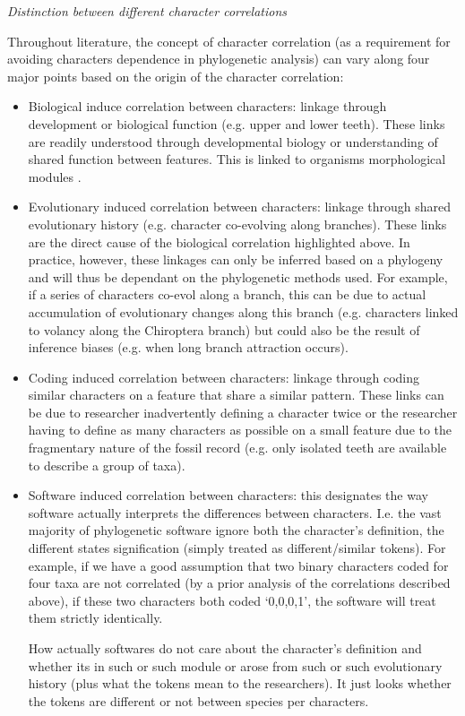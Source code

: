 \documentclass[12pt,letterpaper]{article}
\renewcommand{\subsection}[1]{%
\bigskip
\begin{center}
\begin{large}
\normalfont\itshape #1
\end{large}
\end{center}}
\begin{document}
\subsection{Distinction between different character correlations}

Throughout literature, the concept of character correlation (as a requirement for avoiding characters dependence in phylogenetic analysis) can vary along four major points based on the origin of the character correlation:
\begin{itemize}
    \item Biological induce correlation between characters: linkage through development or biological function (e.g. upper and lower teeth).
    These links are readily understood through developmental biology or understanding of shared function between features.
    This is linked to organisms morphological modules \citep[\textit{sensu}][]{goswami2006morphological}.

    \item Evolutionary induced correlation between characters: linkage through shared evolutionary history (e.g. character co-evolving along branches).
    These links are the direct cause of the biological correlation highlighted above.
    In practice, however, these linkages can only be inferred based on a phylogeny and will thus be dependant on the phylogenetic methods used.
    For example, if a series of characters co-evol along a branch, this can be due to actual accumulation of evolutionary changes along this branch (e.g. characters linked to volancy along the Chiroptera branch) but could also be the result of inference biases (e.g. when long branch attraction occurs).

    \item Coding induced correlation between characters: linkage through coding similar characters on a feature that share a similar pattern.
    These links can be due to researcher inadvertently defining a character twice or the researcher having to define as many characters as possible on a small feature due to the fragmentary nature of the fossil record (e.g. only isolated teeth are available to describe a group of taxa).

    \item Software induced correlation between characters: this designates the way software actually interprets the differences between characters.
    I.e. the vast majority of phylogenetic software ignore both the character's definition, the different states signification (simply treated as different/similar tokens). For example, if we have a good assumption that two binary characters coded for four taxa are not correlated (by a prior analysis of the correlations described above), if these two characters both coded `{0,0,0,1}', the software will treat them strictly identically.

    How actually softwares do not care about the character’s definition and whether its in such or such module or arose from such or such evolutionary history (plus what the tokens mean to the researchers). It just looks whether the tokens are different or not between species per characters.

\end{itemize}
\end{document}
